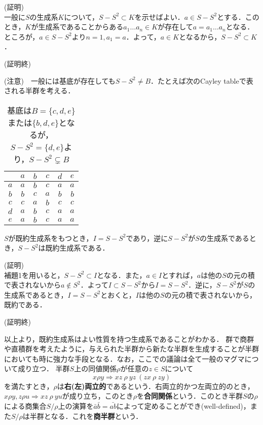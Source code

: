 (証明) \\
一般に$S$の生成系$K$について，$S-S^2\subset K$を示せばよい．$a\in S-S^2$とする．このとき，$K$が生成系であることからある$a_1\dots a_n\in K$が存在して$a=a_1\dots a_n$となる．ところが，$a\in S-S^2$より$n=1, a_1=a$．よって，$a\in K$となるから，$S-S^2\subset K$．
\begin{flushright}
(証明終)
\end{flushright}
(注意)　一般には基底が存在しても$S-S^2\neq B$．たとえば次のCayley tableで表される半群を考える．
\begin{table}[htb]
\begin{center}
\begin{tabular}{c|ccccc}
     &$a$&$b$&$c$&$d$&$e$ \\ \hline
$a$&$a$&$b$&$c$&$a$&$a$ \\
$b$&$b$&$c$&$a$&$b$&$b$ \\
$c$&$c$&$a$&$b$&$c$&$c$ \\
$d$&$a$&$b$&$c$&$a$&$a$ \\
$e$&$a$&$b$&$c$&$a$&$a$
\end{tabular}
\caption{基底は$B=\{c,d,e\}$または$\{b,d,e\}$となるが，$S-S^2=\{d,e\}$より，$S-S^2\subsetneq B$}
\end{center}
\end{table}
\begin{sthm}
$S$が既約生成系をもつとき，$I=S-S^2$であり，逆に$S-S^2$が$S$の生成系であるとき，$S-S^2$は既約生成系である．
\end{sthm}
(証明)　\\
補題1を用いると，$S-S^2\subset I$となる．また，$a\in I$とすれば，$a$は他の$S$の元の積で表されないから$a\notin S^2$．よって$I\subset S-S^2$から$I=S-S^2$．逆に，$S-S^2$が$S$の生成系であるとき，$I=S-S^2$とおくと，$I$は他の$S$の元の積で表されないから，既約である．
\begin{flushright}
(証明終)
\end{flushright}
以上より，既約生成系はよい性質を持つ生成系であることがわかる．
群で商群や直積群を考えたように，与えられた半群から新たな半群を生成することが半群においても時に強力な手段となる．なお，ここでの議論は全て一般のマグマについて成り立つ．
半群$S$上の同値関係$\rho$が任意の$z\in S$について$$x\rho y\Rightarrow  xz\:\rho\: yz\:(zx\:\rho\: zy)$$を満たすとき，$\rho$は{\bf 右(左)両立的}であるという．右両立的かつ左両立的のとき，$x\rho y, z\rho u\Rightarrow xz\:\rho\:yu$が成り立ち，このとき$\rho$を{\bf 合同関係}という．このとき半群$S$の$\rho$による商集合$S/\rho$上の演算を$\bar{a}\bar{b}=\bar{ab}$によって定めることができ(well-defined)，また$S/\rho$は半群となる．これを{\bf 商半群}という．\\
